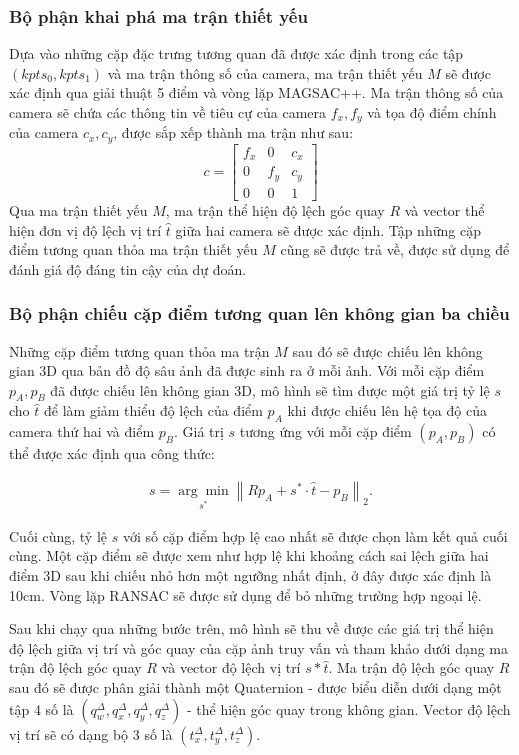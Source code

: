 \subsubsection{Bộ phận khai phá ma trận thiết yếu}

Dựa vào những cặp đặc trưng tương quan đã được xác định trong các tập $(kpts_0, kpts_1)$ và ma trận thông số của camera, ma trận thiết yếu $M$ sẽ được xác định qua giải thuật 5 điểm và vòng lặp MAGSAC++. Ma trận thông số của camera sẽ chứa các thông tin về tiêu cự của camera $f_x,f_y$ và tọa độ điểm chính của camera $c_x,c_y$, được sắp xếp thành ma trận như sau:
$$
  c = \begin{bmatrix} f_x & 0 & c_x \\ 0 & f_y & c_y \\ 0 & 0 & 1 \end{bmatrix}
$$
Qua ma trận thiết yếu $M$, ma trận thể hiện độ lệch góc quay $R$ và vector thể hiện đơn vị độ lệch vị trí $\hat{t}$ giữa hai camera sẽ được xác định. Tập những cặp điểm tương quan thỏa ma trận thiết yếu $M$ cũng sẽ được trả về, được sử dụng để đánh giá độ đáng tin cậy của dự đoán.

\subsubsection{Bộ phận chiếu cặp điểm tương quan lên không gian ba chiều}

Những cặp điểm tương quan thỏa ma trận $M$ sau đó sẽ được chiếu lên không gian 3D qua bản đồ độ sâu ảnh đã được sinh ra ở mỗi ảnh. Với mỗi cặp điểm $p_A, p_B$ đã được chiếu lên không gian 3D, mô hình sẽ tìm được một giá trị tỷ lệ $s$ cho $\hat{t}$ để làm giảm thiểu độ lệch của điểm $p_A$ khi được chiếu lên hệ tọa độ của camera thứ hai và điểm $p_B$. Giá trị $s$ tương ứng với mỗi cặp điểm $(p_A, p_B)$ có thể được xác định qua công thức:

$$
  \begin{aligned}
    s=\underset{s^*}{\arg \min }\left\|R p_A+s^* \cdot \hat{t}-p_B\right\|_2 .
  \end{aligned}
$$

Cuối cùng, tỷ lệ $s$ với số cặp điểm hợp lệ cao nhất sẽ được chọn làm kết quả cuối cùng. Một cặp điểm sẽ được xem như hợp lệ khi khoảng cách sai lệch giữa hai điểm 3D sau khi chiếu nhỏ hơn một ngưỡng nhất định, ở đây được xác định là 10cm. Vòng lặp RANSAC sẽ được sử dụng để bỏ những trường hợp ngoại lệ.

Sau khi chạy qua những bước trên, mô hình sẽ thu về được các giá trị thể hiện độ lệch giữa vị trí và góc quay của cặp ảnh truy vấn và tham khảo dưới dạng ma trận độ lệch góc quay $R$ và vector độ lệch vị trí $s*\hat{t}$. Ma trận độ lệch góc quay $R$ sau đó sẽ được phân giải thành một Quaternion - được biểu diễn dưới dạng một tập 4 số là $(q^{\Delta}_w,q^{\Delta}_x,q^{\Delta}_y,q^{\Delta}_z)$ - thể hiện góc quay trong không gian. Vector độ lệch vị trí sẽ có dạng bộ 3 số là $(t^{\Delta}_x,t^{\Delta}_y,t^{\Delta}_z)$.

